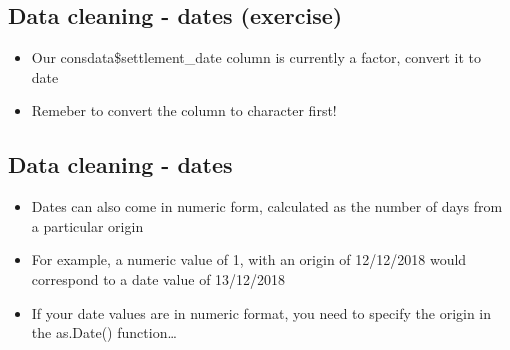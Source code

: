 \documentclass[]{article}
\newenvironment{Shaded}{\begin{snugshade}}{\end{snugshade}}
\newcommand{\KeywordTok}[1]{\textcolor[rgb]{0.13,0.29,0.53}{\textbf{#1}}}
\newcommand{\DataTypeTok}[1]{\textcolor[rgb]{0.13,0.29,0.53}{#1}}
\newcommand{\StringTok}[1]{\textcolor[rgb]{0.31,0.60,0.02}{#1}}
\newcommand{\OperatorTok}[1]{\textcolor[rgb]{0.81,0.36,0.00}{\textbf{#1}}}
\newcommand{\NormalTok}[1]{#1}
\providecommand{\tightlist}{%
  \setlength{\itemsep}{0pt}\setlength{\parskip}{0pt}}
\begin{document}
\subsection{Data cleaning - dates
(exercise)}\label{data-cleaning---dates-exercise}

\begin{itemize}
\tightlist
\item
  Our consdata\$settlement\_date column is currently a factor, convert
  it to date
\item
  Remeber to convert the column to character first!
\end{itemize}

\begin{Shaded}
\end{Shaded}

\begin{Shaded}
\end{Shaded}

\subsection{Data cleaning - dates}\label{data-cleaning---dates-1}

\begin{itemize}
\tightlist
\item
  Dates can also come in numeric form, calculated as the number of days
  from a particular origin
\item
  For example, a numeric value of 1, with an origin of 12/12/2018 would
  correspond to a date value of 13/12/2018
\item
  If your date values are in numeric format, you need to specify the
  origin in the as.Date() function\ldots{}
\end{itemize}
\end{document}
